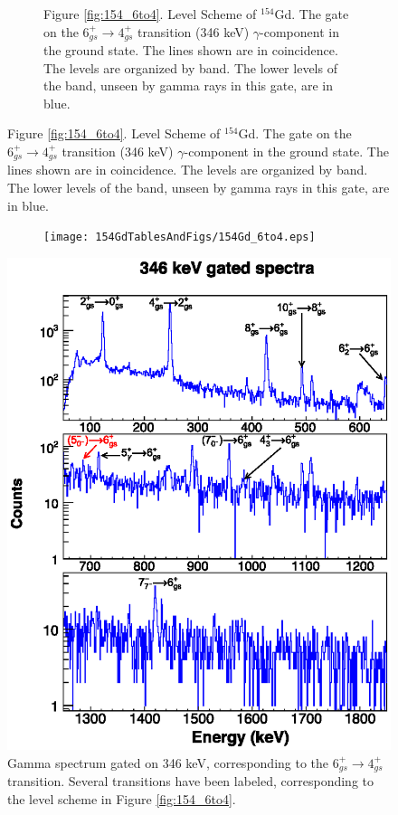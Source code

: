 \begin{landscape}
\begin{figure}[!]
    \centering
    \label{fig:154_6to4}
    \begin{subfigure}{1.4\textwidth}
    \caption*{\centering \fontsize{10pt}{12pt}Figure \ref{fig:154_6to4}. Level Scheme of $^{154}$Gd. The gate on the $6_{gs}^+\rightarrow 4_{gs}^+$ transition (346 keV) $\gamma$-component in the ground state. The lines shown are in coincidence. The levels are organized by band. The lower levels of the band, unseen by gamma rays in this gate, are in blue.}
    \end{subfigure}
\end{figure}
\clearpage
\begin{figure}
    \ContinuedFloat
    \begin{subfigure}{1.4\textwidth}
    \texttt{[image: 154GdTablesAndFigs/154Gd\_6to4.eps]}
    \label{fig:154_6to4level}
    \end{subfigure}
\end{figure}
\end{landscape}
\begin{figure}
    \includegraphics[scale=1.3]{154GdTablesAndFigs/346_gamma.eps}
    \caption{Gamma spectrum gated on 346 keV, corresponding to the $6_{gs}^+\rightarrow 4_{gs}^+$ transition. Several transitions have been labeled, corresponding to the level scheme in Figure \ref{fig:154_6to4}.}
    \label{fig:154_6to4spec}
\end{figure}